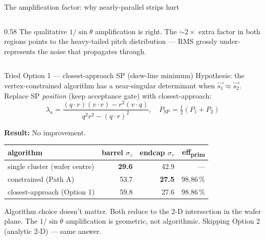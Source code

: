 \documentclass[aspectratio=169,10pt]{beamer}
\begin{document}
\begin{frame}{The amplification factor: why nearly-parallel strips hurt}
\begin{columns}[T]
\begin{column}{0.58\textwidth}
The qualitative $1/\sin\theta$ amplification is right. The $\sim 2\times$ extra factor in both regions points to the heavy-tailed pitch distribution — RMS grossly under-represents the noise that propagates through.
\end{column}
\end{columns}
\end{frame}

\begin{frame}{Tried Option 1 — closest-approach SP (skew-line minimum)}
\footnotesize
Hypothesis: the vertex-constrained algorithm has a near-singular determinant when $\vec{s_1}\!\approx\!\vec{s_2}$. Replace SP \emph{position} (keep acceptance gate) with closest-approach:
\[
\lambda_a = \frac{(q\!\cdot\! r)(v\!\cdot\! r) - r^2(v\!\cdot\! q)}{q^2 r^2 - (q\!\cdot\! r)^2}, \quad P_\mathrm{SP} = \tfrac{1}{2}(P_1+P_2)
\]

\textbf{Result:} \alert{No improvement.}
\begin{tabular}{lrrr}
\toprule
algorithm & barrel $\sigma_z$ & endcap $\sigma_r$ & eff\textsubscript{prim} \\
\midrule
single cluster (wafer centre) & \textbf{29.6} & 42.9 & --- \\
constrained (Path A) & 53.7 & \textbf{27.5} & 98.86\,\% \\
closest-approach (Option 1) & 59.8 & 27.6 & 98.86\,\% \\
\bottomrule
\end{tabular}

\smallskip
\alert{Algorithm choice doesn't matter.} Both reduce to the 2-D intersection in the wafer plane. The $1/\sin\theta$ amplification is geometric, not algorithmic. Skipping Option 2 (analytic 2-D) — same answer.
\end{frame}
\end{document}

